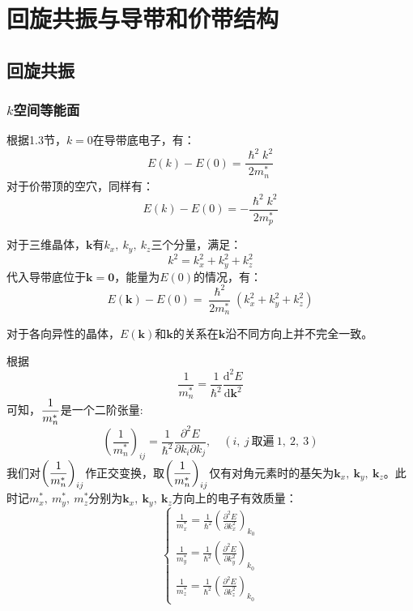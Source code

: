 \chapter{回旋共振与导带和价带结构}

\section{回旋共振}

\subsection{\texorpdfstring{$k$}{k}空间等能面}

根据1.3节，$k=0$在导带底电子，有：
\begin{equation}
    E(k)-E(0)=\frac{\hslash^2k^2}{2m_n^*}
\end{equation}
对于价带顶的空穴，同样有：
\begin{equation}
    E(k)-E(0)=-\frac{\hslash^2k^2}{2m_p^*}
\end{equation}

对于三维晶体，$\bm k$有$k_x,\ k_y,\ k_z$三个分量，满足：
\begin{equation}
    k^2=k_x^2+k_y^2+k_z^2
\end{equation}
代入导带底位于$\bm k=\bm 0$，能量为$E(0)$的情况，有：
\begin{equation}
    E(\bm k)-E(0)=\frac{\hslash^2}{2m_n^*}\left(k_x^2+k_y^2+k_z^2\right)
\end{equation}

对于各向异性的晶体，$E(\bm k)$和$\bm k$的关系在$\bm k$沿不同方向上并不完全一致。

根据
\begin{equation}
    \frac{1}{m_n^*}=\frac{1}{\hslash^2}\frac{\mathrm{d}^2E}{\mathrm{d}\bm k^2}
\end{equation}
\vspace{1ex}可知，$\displaystyle\frac{1}{m_n^*}$是一个二阶张量:
\begin{equation}
    \left(\frac{1}{m_n^*}\right)_{ij}=\frac{1}{\hslash^2}\frac{\partial^2E}{\partial k_i\partial k_j},\quad (i,\ j\ \text{取遍}\ 1,\ 2,\ 3)
\end{equation}
\vspace{1ex}我们对$\displaystyle\left(\frac{1}{m_n^*}\right)_{ij}$作正交变换，取$\displaystyle\left(\frac{1}{m_n^*}\right)_{ij}$仅有对角元素时的基矢为$\bm k_x,\ \bm k_y,\ \bm k_z$。此时记$m_x^*,\ m_y^*,\ m_z^*$分别为$\bm k_x,\ \bm k_y,\ \bm k_z$方向上的电子有效质量：
\begin{equation}
    \left\{
    \begin{aligned}
        \frac{1}{m_x^*}=\frac{1}{\hslash^2}\left(\frac{\partial^2E}{\partial k_x^2}\right)_{k_0}\\
        \frac{1}{m_y^*}=\frac{1}{\hslash^2}\left(\frac{\partial^2E}{\partial k_y^2}\right)_{k_0}\\
        \frac{1}{m_z^*}=\frac{1}{\hslash^2}\left(\frac{\partial^2E}{\partial k_z^2}\right)_{k_0}
        \end{aligned}
    \right.
\end{equation}

